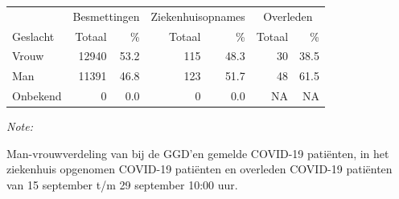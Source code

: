 \documentclass[
  english,
  man,floatsintext]{apa6}
\begin{document}
\begin{table}
\centering\begingroup\fontsize{11}{13}\selectfont

\begin{threeparttable}
\begin{tabular}{lrrrrrr}
\toprule
\multicolumn{1}{c}{ } & \multicolumn{2}{c}{Besmettingen} & \multicolumn{2}{c}{Ziekenhuisopnames} & \multicolumn{2}{c}{Overleden} \\
\cmidrule(l{3pt}r{3pt}){2-3} \cmidrule(l{3pt}r{3pt}){4-5} \cmidrule(l{3pt}r{3pt}){6-7}
Geslacht & Totaal & \% & Totaal & \% & Totaal & \%\\
\midrule
Vrouw & 12940 & 53.2 & 115 & 48.3 & 30 & 38.5\\
Man & 11391 & 46.8 & 123 & 51.7 & 48 & 61.5\\
Onbekend & 0 & 0.0 & 0 & 0.0 & NA & NA\\
\bottomrule
\end{tabular}
\begin{tablenotes}
\item \textit{Note: } 
\item Man-vrouwverdeling van bij de GGD’en gemelde COVID-19 patiënten, in het ziekenhuis opgenomen COVID-19 patiënten en overleden COVID-19 patiënten van 15 september t/m 29 september 10:00 uur.
\end{tablenotes}
\end{threeparttable}
\endgroup{}
\end{table}
\newpage
\end{document}

